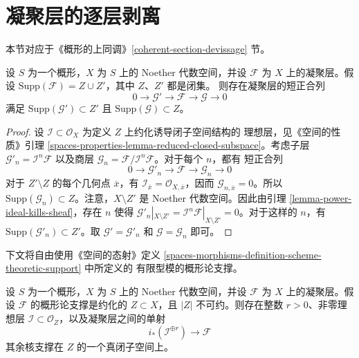 \section{凝聚层的逐层剥离}
\label{section-devissage}

\noindent
本节对应于《概形的上同调》\ref{coherent-section-devissage} 节。

\begin{lemma}
\label{lemma-prepare-filter-support}
设 $S$ 为一个概形，$X$ 为 $S$ 上的 Noether 代数空间，并设 $\mathcal{F}$
为 $X$ 上的凝聚层。假设
$\text{Supp}(\mathcal{F}) = Z \cup Z'$，其中 $Z$、$Z'$ 都是闭集。
则存在凝聚层的短正合列
$$
0 \to \mathcal{G}' \to \mathcal{F} \to \mathcal{G} \to 0
$$
满足 $\text{Supp}(\mathcal{G}') \subset Z'$ 且
$\text{Supp}(\mathcal{G}) \subset Z$。
\end{lemma}

\begin{proof}
设 $\mathcal{I} \subset \mathcal{O}_X$ 为定义 $Z$ 上约化诱导闭子空间结构的
理想层，见《空间的性质》引理
\ref{spaces-properties-lemma-reduced-closed-subspace}。考虑子层
$\mathcal{G}'_n = \mathcal{I}^n\mathcal{F}$ 以及商层
$\mathcal{G}_n = \mathcal{F}/\mathcal{I}^n\mathcal{F}$。对于每个 $n$，都有
短正合列
$$
0 \to \mathcal{G}'_n \to \mathcal{F} \to \mathcal{G}_n \to 0
$$
对于 $Z' \setminus Z$ 的每个几何点 $\overline{x}$，有
$\mathcal{I}_{\overline{x}} = \mathcal{O}_{X, \overline{x}}$，因而
$\mathcal{G}_{n, \overline{x}} = 0$。所以
$\text{Supp}(\mathcal{G}_n) \subset Z$。注意，$X \setminus Z'$ 是 Noether
代数空间。因此由引理 \ref{lemma-power-ideal-kills-sheaf}，存在 $n$ 使得
$\mathcal{G}'_n|_{X \setminus Z'} =
\mathcal{I}^n\mathcal{F}|_{X \setminus Z'} = 0$。对于这样的 $n$，有
$\text{Supp}(\mathcal{G}'_n) \subset Z'$。取
$\mathcal{G}' = \mathcal{G}'_n$ 和 $\mathcal{G} = \mathcal{G}_n$ 即可。
\end{proof}

\noindent
下文将自由使用《空间的态射》定义
\ref{spaces-morphisms-definition-scheme-theoretic-support} 中所定义的
有限型模的概形论支撑。

\begin{lemma}
\label{lemma-prepare-filter-irreducible}
设 $S$ 为一个概形，$X$ 为 $S$ 上的 Noether 代数空间，并设 $\mathcal{F}$
为 $X$ 上的凝聚层。假设 $\mathcal{F}$ 的概形论支撑是约化的
$Z \subset X$，且 $|Z|$ 不可约。则存在整数 $r > 0$、非零理想层
$\mathcal{I} \subset \mathcal{O}_Z$，以及凝聚层之间的单射
$$
i_*\left(\mathcal{I}^{\oplus r}\right) \to \mathcal{F}
$$
其余核支撑在 $Z$ 的一个真闭子空间上。%
\end{lemma}

